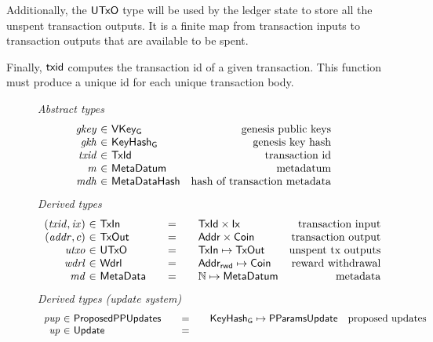 Additionally, the $\mathsf{UTxO}$ type will be used by the ledger state to store all the
unspent transaction outputs. It is a finite map from transaction inputs
to transaction outputs that are available to be spent.

Finally, $\mathsf{txid}$ computes the transaction id of a given transaction.
This function must produce a unique id for each unique transaction body.

\begin{figure*}[htb]
  \emph{Abstract types}
  \begin{equation*}
    \begin{array}{r@{~\in~}lr}
      \var{gkey} & \VKeyGen & \text{genesis public keys}\\
      \var{gkh} & \KeyHashGen & \text{genesis key hash}\\
      \var{txid} & \TxId & \text{transaction id}\\
      \var{m} & \MetaDatum & \text{metadatum}\\
      \var{mdh} & \MetaDataHash & \text{hash of transaction metadata}\\
    \end{array}
  \end{equation*}
  \emph{Derived types}
  \begin{equation*}
    \begin{array}{r@{~\in~}l@{\qquad=\qquad}lr}
      (\var{txid}, \var{ix})
      & \TxIn
      & \TxId \times \Ix
      & \text{transaction input}
      \\
      (\var{addr}, c)
      & \type{TxOut}
      & \Addr \times \Coin
      & \text{transaction output}
      \\
      \var{utxo}
      & \UTxO
      & \TxIn \mapsto \TxOut
      & \text{unspent tx outputs}
      \\
      \var{wdrl}
      & \Wdrl
      & \AddrRWD \mapsto \Coin
      & \text{reward withdrawal}
      \\
      \var{md}
      & \MetaData
      & \N \mapsto \MetaDatum
      & \text{metadata}
    \end{array}
  \end{equation*}
  \emph{Derived types (update system)}
  \begin{equation*}
    \begin{array}{r@{~\in~}l@{\qquad=\qquad}lr}
      \var{pup}
      & \ProposedPPUpdates
      & \KeyHashGen \mapsto \PParamsUpdate
      & \text{proposed updates}
      \\
      \var{up}
      & \Update

\end{array}
\end{equation*}
\end{figure*}

